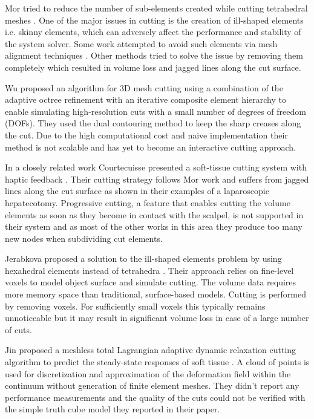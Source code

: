 Mor \etal tried to reduce the number of sub-elements created while cutting tetrahedral meshes \cite{Mor2000}.
One of the major issues in cutting is the creation of ill-shaped elements i.e. skinny elements, which can adversely affect the
performance and stability of the system solver. Some work attempted to avoid such elements via mesh alignment techniques 
\cite{Nienhuys2001b, Steinemann2006}. Other methods tried to solve the issue by removing them completely which resulted in 
volume loss and jagged lines along the cut surface. 

 
Wu \etal \cite{Wu2011} proposed an algorithm for 3D mesh cutting using a combination of the adaptive octree refinement with an iterative composite
element hierarchy to enable simulating high-resolution cuts with a small number of degrees of freedom (DOFs). 
They used the dual contouring method \cite{Ju2002} to keep the sharp creases along the cut. Due to the high computational cost and naive implementation 
their method is not scalable and has yet to become an interactive cutting approach.

In a closely related work Courtecuisse \etal presented a soft-tissue cutting system with haptic 
feedback \cite{Courtecuisse2010}. Their cutting strategy follows Mor \etal  \cite{Mor2000} work and 
suffers from jagged lines along the cut surface as shown in their examples of a laparoscopic hepatecotomy.
Progressive cutting, a feature that enables cutting the volume elements as soon as they become in contact with 
the scalpel, is not supported in their system and as most of the other works in this area they produce too many
new nodes when subdividing cut elements.

Jerabkova \etal proposed a solution to the ill-shaped elements problem by using hexahedral elements instead of 
tetrahedra \cite{Jerabkova2010}. Their approach relies on fine-level voxels to model object surface and simulate cutting. 
The volume data requires more memory space than traditional, surface-based models. Cutting is performed by
removing voxels. For sufficiently small voxels this typically remains unnoticeable but it may result in 
significant volume loss in case of a large number of cuts. 

Jin \etal proposed a meshless total Lagrangian adaptive dynamic relaxation cutting algorithm to predict the steady-state 
responses of soft tissue \cite{Jin2013}. A cloud of points is used for discretization and approximation of the deformation 
field within the continuum without generation of finite element meshes. They didn't report any performance measurements 
and the quality of the cuts could not be verified with the simple truth cube model they reported in their paper.

